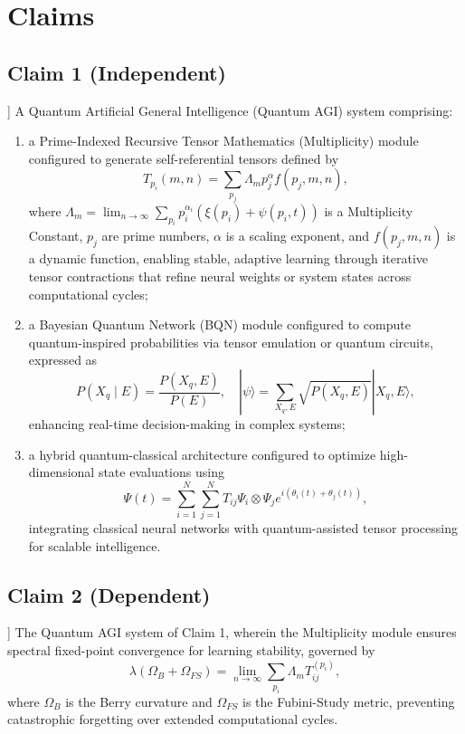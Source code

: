\documentclass[12pt]{article}
\begin{document}
\section{Claims}

\begin{enumerate}
    \subsection{Claim 1 (Independent)}] A Quantum Artificial General Intelligence (Quantum AGI) system comprising:
    \begin{enumerate}
        \item[(a)] a Prime-Indexed Recursive Tensor Mathematics (Multiplicity) module configured to generate self-referential tensors defined by
        \begin{equation}
        T_{p_i}(m, n) = \sum_{p_j} \Lambda_m p_j^\alpha f(p_j, m, n),
        \end{equation}
        where \( \Lambda_m = \lim_{n \to \infty} \sum_{p_i} p_i^{\alpha_i} (\xi(p_i) + \psi(p_i, t)) \) is a Multiplicity Constant, \( p_j \) are prime numbers, \( \alpha \) is a scaling exponent, and \( f(p_j, m, n) \) is a dynamic function, enabling stable, adaptive learning through iterative tensor contractions that refine neural weights or system states across computational cycles;
        \item[(b)] a Bayesian Quantum Network (BQN) module configured to compute quantum-inspired probabilities via tensor emulation or quantum circuits, expressed as
        \begin{equation}
        P(X_q \mid E) = \frac{P(X_q, E)}{P(E)}, \quad |\psi\rangle = \sum_{X_q, E} \sqrt{P(X_q, E)} |X_q, E\rangle,
        \end{equation}
        enhancing real-time decision-making in complex systems;
        \item[(c)] a hybrid quantum-classical architecture configured to optimize high-dimensional state evaluations using
        \begin{equation}
        \Psi(t) = \sum_{i=1}^N \sum_{j=1}^N T_{ij} \Psi_i \otimes \Psi_j e^{i(\theta_i(t) + \theta_j(t))},
        \end{equation}
        integrating classical neural networks with quantum-assisted tensor processing for scalable intelligence.
    \end{enumerate}

    \subsection{Claim 2 (Dependent)}] The Quantum AGI system of Claim 1, wherein the Multiplicity module ensures spectral fixed-point convergence for learning stability, governed by
    \begin{equation}
    \lambda (\Omega_B + \Omega_{FS}) = \lim_{n \to \infty} \sum_{p_i} \Lambda_m T_{ij}^{(p_i)},
    \end{equation}
    where \( \Omega_B \) is the Berry curvature and \( \Omega_{FS} \) is the Fubini-Study metric, preventing catastrophic forgetting over extended computational cycles.


\end{enumerate}
\end{document}
